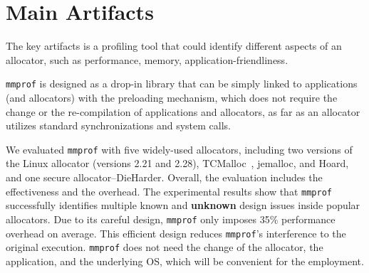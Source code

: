 \documentclass[pageno]{jpaper}
\newcommand{\MP}{\texttt{mmprof}}
\begin{document}


\section{Main Artifacts}
\label{sec:main-artifacts}


The key artifacts is a profiling tool that could identify different aspects of an allocator, such as performance, memory, application-friendliness. 

\MP{} is designed as a drop-in library that can be simply linked to applications (and allocators) with the preloading mechanism, which does not require the change or the re-compilation of applications and allocators, as far as an allocator utilizes standard synchronizations and system calls.

We evaluated \MP{} with five widely-used allocators, including two versions of the Linux allocator (versions 2.21 and 2.28), TCMalloc~\cite{tcmalloc}, jemalloc, and Hoard, and one secure allocator--DieHarder. Overall, the evaluation includes the effectiveness and the overhead. The experimental results show that \MP{} successfully identifies multiple known and \textbf{unknown} design issues inside popular allocators. Due to its careful design, \MP{} only imposes 35\% performance overhead on average. This efficient design reduces \MP{}'s interference to the original execution. \MP{} does not need the change of the allocator, the application, and the underlying OS, which will be convenient for the employment. 


\end{document}
